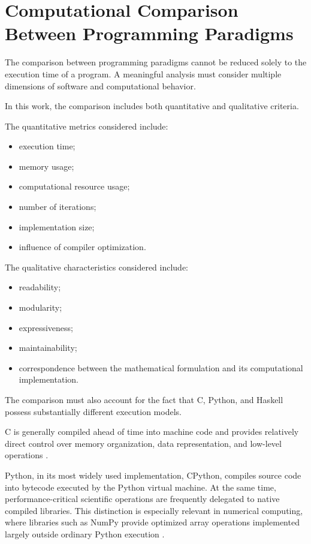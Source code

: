\section{Computational Comparison Between Programming Paradigms}

The comparison between programming paradigms cannot be reduced solely to the
execution time of a program. A meaningful analysis must consider multiple
dimensions of software and computational behavior.

In this work, the comparison includes both quantitative and qualitative
criteria.

The quantitative metrics considered include:

\begin{itemize}
    \item execution time;
    \item memory usage;
    \item computational resource usage;
    \item number of iterations;
    \item implementation size;
    \item influence of compiler optimization.
\end{itemize}

The qualitative characteristics considered include:

\begin{itemize}
    \item readability;
    \item modularity;
    \item expressiveness;
    \item maintainability;
    \item correspondence between the mathematical formulation and its
    computational implementation.
\end{itemize}

The comparison must also account for the fact that C, Python, and Haskell
possess substantially different execution models.

C is generally compiled ahead of time into machine code and provides relatively
direct control over memory organization, data representation, and low-level
operations \cite{kernighan1988c}.

Python, in its most widely used implementation, CPython, compiles source code
into bytecode executed by the Python virtual machine. At the same time,
performance-critical scientific operations are frequently delegated to native
compiled libraries. This distinction is especially relevant in numerical
computing, where libraries such as NumPy provide optimized array operations
implemented largely outside ordinary Python execution
\cite{harris2020array}.

